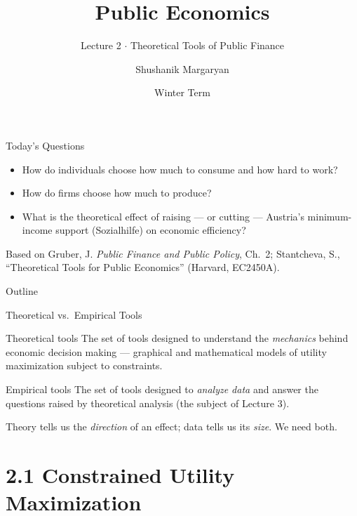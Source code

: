 \documentclass[11pt,aspectratio=169]{beamer}
\title{Public Economics}
\subtitle{Lecture 2 \(\cdot\) Theoretical Tools of Public Finance}
\author{Shushanik Margaryan}
\institute{WU Vienna University of Economics and Business}
\date{Winter Term}
\begin{document}
\begin{frame}
  \titlepage
\end{frame}

\begin{frame}{Today's Questions}
  \begin{itemize}
    \item How do individuals choose how much to consume and how hard to work?
    \item How do firms choose how much to produce?
    \item What is the theoretical effect of raising --- or cutting --- Austria's minimum-income support (\alert{Sozialhilfe}) on economic efficiency?
  \end{itemize}
  \vspace{1em}
  \begin{block}{Based on}
    Gruber, J. \emph{Public Finance and Public Policy}, Ch.\ 2; Stantcheva, S., ``Theoretical Tools for Public Economics'' (Harvard, EC2450A).
  \end{block}
\end{frame}

\begin{frame}{Outline}
  \tableofcontents
\end{frame}

\begin{frame}{Theoretical vs.\ Empirical Tools}
  \begin{block}{Theoretical tools}
    The set of tools designed to understand the \emph{mechanics} behind economic decision making --- graphical and mathematical models of utility maximization subject to constraints.
  \end{block}
  \begin{block}{Empirical tools}
    The set of tools designed to \emph{analyze data} and answer the questions raised by theoretical analysis (the subject of Lecture 3).
  \end{block}
  \vspace{0.5em}
  \centering
  Theory tells us the \emph{direction} of an effect; data tells us its \emph{size}. We need both.
\end{frame}

\section{2.1 Constrained Utility Maximization}
\end{document}
